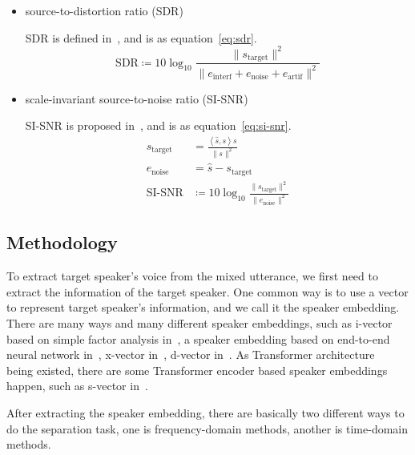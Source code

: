 \begin{itemize}
    \item source-to-distortion ratio (SDR)

    SDR is defined in~\cite{performance_measurement}, and is as equation~\ref{eq:sdr}.
    \begin{equation}
        \text{SDR} \coloneqq 10\log_{10}\frac{\| s_{\text{target}} \|^2}{\| e_{\text{interf}} + e_{\text{noise}} + e_{\text{artif}} \|^2}
        \label{eq:sdr}
    \end{equation}

    \item scale-invariant source-to-noise ratio (SI-SNR)

    SI-SNR is proposed in~\cite{tasnet}, and is as equation~\ref{eq:si-snr}.
    \begin{equation}
        \begin{aligned}
            s_{\text{target}} &= \frac{\left< \hat{s}, s \right>s}{\| s \|^2} \\
            e_{\text{noise}} &= \hat{s} - s_{\text{target}} \\
            \text{SI-SNR} &\coloneqq 10\log_{10}\frac{\| s_{\text{target}} \|^2}{\| e_{\text{noise}} \|^2}
        \end{aligned}\label{eq:si-snr}
    \end{equation}
\end{itemize}

\subsection{Methodology}\label{subsec:methodology}

To extract target speaker's voice from the mixed utterance, we first need to extract the information of the target speaker.
One common way is to use a vector to represent target speaker's information, and we call it the speaker embedding.
There are many ways and many different speaker embeddings, such as i-vector based on simple factor analysis in~\cite{i-vector}, a speaker embedding based on end-to-end neural network in~\cite{deep_speaker}, x-vector in~\cite{x-vector}, d-vector in~\cite{d-vector}.
As Transformer architecture~\cite{attention} being existed, there are some Transformer encoder based speaker embeddings happen, such as s-vector in~\cite{s-vector}.

After extracting the speaker embedding, there are basically two different ways to do the separation task, one is frequency-domain methods, another is time-domain methods.

